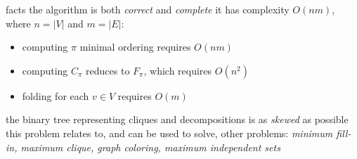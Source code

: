 \documentclass{beamer}
\begin{document}
\begin{frame}{facts}
the algorithm is both \textit{correct} and \textit{complete}
\vfill
it has complexity $O(nm)$, where $n=|V|$ and $m=|E|$:
\begin{itemize}
    \item computing $\pi$ minimal ordering requires $O(nm)$
    \item computing $C_{\pi}$ reduces to $F_{\pi}$, which requires $O(n^{2})$
    \item folding for each $v\in V$ requires $O(m)$
\end{itemize}
\vfill
the binary tree representing cliques and decompositions is as \textit{skewed} as possible
\vfill
this problem relates to, and can be used to solve, other problems:
\textit{minimum fill-in, maximum clique, graph coloring, maximum independent sets}
\end{frame}
  

\begin{frame}{ }
\Huge \smiley
\end{frame}
\end{document}
